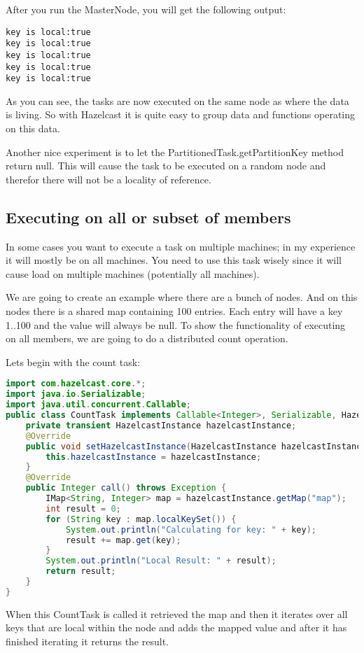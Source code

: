 After you run the MasterNode, you will get the following output:
\begin{verbatim}
key is local:true
key is local:true
key is local:true
key is local:true
key is local:true
\end{verbatim}
As you can see, the tasks are now executed on the same node as where the data is living. 
So with Hazelcast it is quite easy to group data and functions operating on this data. 

Another nice experiment is to let the PartitionedTask.getPartitionKey method return null. This will cause the task to be executed on a random node and therefor there will not be a locality of reference.

\subsection{Executing on all or subset of members}
In some cases you want to execute a task on multiple machines; in my experience it will mostly be on all machines. You need to use this task wisely since it will cause load on multiple machines (potentially all machines).

We are going to create an example where there are a bunch of nodes. And on this nodes there is a shared map containing 100 entries. Each entry will have a key 1..100 and the value will always be null. To show the functionality of executing on all members, we are going to do a distributed count operation.

Lets begin with the count task:
\begin{lstlisting}[language=java]
import com.hazelcast.core.*;
import java.io.Serializable;
import java.util.concurrent.Callable;
public class CountTask implements Callable<Integer>, Serializable, HazelcastInstanceAware {
    private transient HazelcastInstance hazelcastInstance;
    @Override
    public void setHazelcastInstance(HazelcastInstance hazelcastInstance) {
        this.hazelcastInstance = hazelcastInstance;
    }
    @Override
    public Integer call() throws Exception {
        IMap<String, Integer> map = hazelcastInstance.getMap("map");
        int result = 0;
        for (String key : map.localKeySet()) {
            System.out.println("Calculating for key: " + key);
            result += map.get(key);
        }
        System.out.println("Local Result: " + result);
        return result;
    }
}

\end{lstlisting}
When this CountTask is called it retrieved the map and then it iterates over all keys that are local within the node and adds the mapped value and after it has finished iterating it returns the result.

